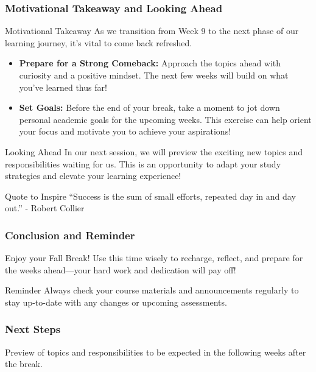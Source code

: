 \documentclass[aspectratio=169]{beamer}
\begin{document}
\begin{frame}[fragile]
    \frametitle{Motivational Takeaway and Looking Ahead}
    \begin{block}{Motivational Takeaway}
        As we transition from Week 9 to the next phase of our learning journey, it’s vital to come back refreshed.
        \begin{itemize}
            \item \textbf{Prepare for a Strong Comeback:} Approach the topics ahead with curiosity and a positive mindset. The next few weeks will build on what you've learned thus far!
            \item \textbf{Set Goals:} Before the end of your break, take a moment to jot down personal academic goals for the upcoming weeks. This exercise can help orient your focus and motivate you to achieve your aspirations!
        \end{itemize}
    \end{block}
    
    \begin{block}{Looking Ahead}
        In our next session, we will preview the exciting new topics and responsibilities waiting for us. This is an opportunity to adapt your study strategies and elevate your learning experience!
    \end{block}
    
    \begin{block}{Quote to Inspire}
        “Success is the sum of small efforts, repeated day in and day out.” - Robert Collier
    \end{block}
\end{frame}

\begin{frame}[fragile]
    \frametitle{Conclusion and Reminder}
    Enjoy your Fall Break! Use this time wisely to recharge, reflect, and prepare for the weeks ahead—your hard work and dedication will pay off!
    
    \begin{block}{Reminder}
        Always check your course materials and announcements regularly to stay up-to-date with any changes or upcoming assessments.
    \end{block}
\end{frame}

\begin{frame}[fragile]
    \frametitle{Next Steps}
    Preview of topics and responsibilities to be expected in the following weeks after the break.
\end{frame}
\end{document}
